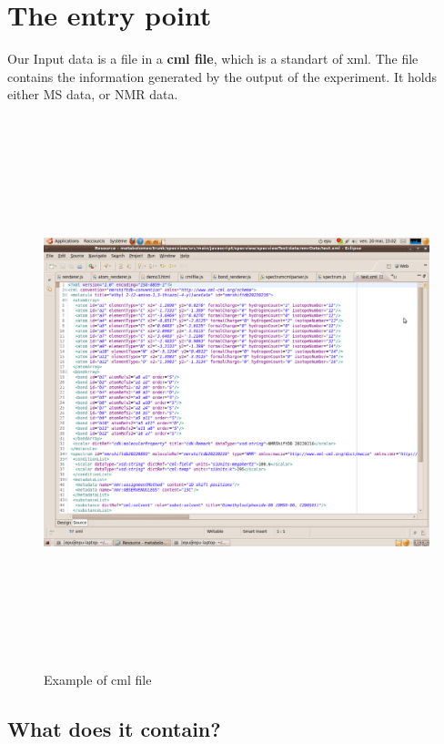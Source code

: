 \section{The entry point}

Our Input data is a file in a \textbf{cml file}, which is a standart of xml. The file contains the information generated by the output of the experiment. It holds either MS data, or NMR data.\\
    \begin{figure}[h]
    \begin{centering}
    \caption{Example of cml file}
\includegraphics[width=190mm,height=160mm]{./images/sampleCML}
    \end{centering}
    \end{figure}

\subsection{What does it contain?}

